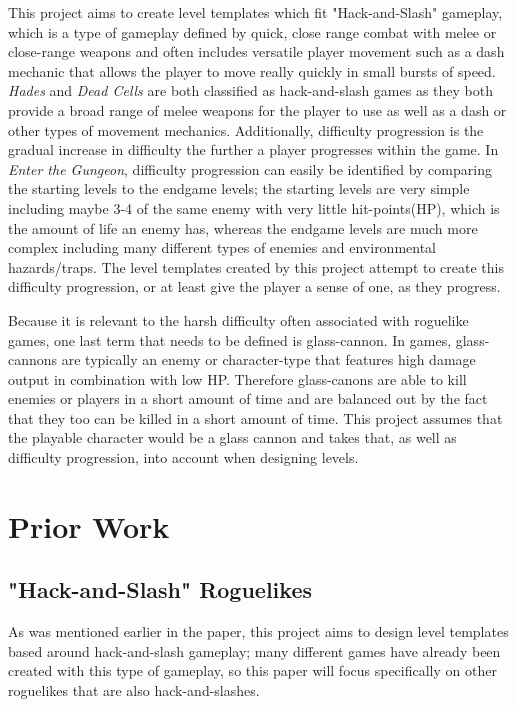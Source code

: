 \documentclass[10pt,twocolumn]{article}
\begin{document}
This project aims to create level templates which fit "Hack-and-Slash" gameplay, which is a type of gameplay defined by quick, close range combat with melee or close-range weapons and often includes versatile player movement such as a dash mechanic that allows the player to move really quickly in small bursts of speed. \textit{Hades} and \textit{Dead Cells} are both classified as hack-and-slash games as they both provide a broad range of melee weapons for the player to use as well as a dash or other types of movement mechanics. Additionally, difficulty progression is the gradual increase in difficulty the further a player progresses within the game. In \textit{Enter the Gungeon}\cite{enterthegungeon}, difficulty progression can easily be identified by comparing the starting levels to the endgame levels; the starting levels are very simple including maybe 3-4 of the same enemy with very little hit-points(HP), which is the amount of life an enemy has, whereas the endgame levels are much more complex including many different types of enemies and environmental hazards/traps. The level templates created by this project attempt to create this difficulty progression, or at least give the player a sense of one, as they progress. 

Because it is relevant to the harsh difficulty often associated with roguelike games, one last term that needs to be defined is glass-cannon. In games, glass-cannons are typically an enemy or character-type that features high damage output in combination with low HP. Therefore glass-canons are able to kill enemies or players in a short amount of time and are balanced out by the fact that they too can be killed in a short amount of time. This project assumes that the playable character would be a glass cannon and takes that, as well as difficulty progression, into account when designing levels.

\section{Prior Work}

\subsection{"Hack-and-Slash" Roguelikes}

As was mentioned earlier in the paper, this project aims to design level templates based around hack-and-slash gameplay; many different games have already been created with this type of gameplay, so this paper will focus specifically on other roguelikes that are also hack-and-slashes. 
\end{document}
